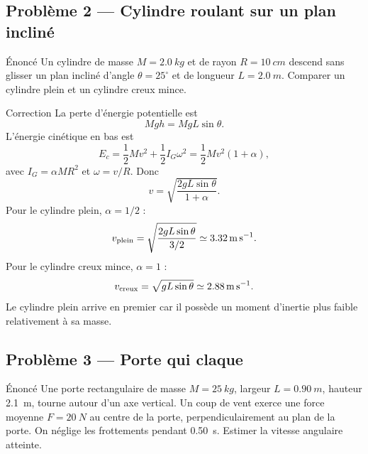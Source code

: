 \documentclass[11pt,a4paper]{article}
\begin{document}
\subsection{Problème 2 — Cylindre roulant sur un plan incliné}

\begin{exercisebox}{Énoncé}{}
Un cylindre de masse $M=\SI{2.0}{kg}$ et de rayon $R=\SI{10}{cm}$ descend sans glisser un plan incliné d'angle $\theta=25^\circ$ et de longueur $L=\SI{2.0}{m}$.
Comparer un cylindre plein et un cylindre creux mince.
\end{exercisebox}

\begin{center}
\end{center}

\begin{correctionbox}{Correction}{}
La perte d'énergie potentielle est
\[
Mgh=MgL\sin\theta.
\]
L'énergie cinétique en bas est
\[
E_c=\frac12Mv^2+\frac12I_G\omega^2
=\frac12Mv^2(1+\alpha),
\]
avec $I_G=\alpha MR^2$ et $\omega=v/R$.
Donc
\[
v=\sqrt{\frac{2gL\sin\theta}{1+\alpha}}.
\]
Pour le cylindre plein, $\alpha=1/2$ :
\[
v_{\rm plein}
=
\sqrt{\frac{2gL\sin\theta}{3/2}}
\simeq \SI{3.32}{m.s^{-1}}.
\]
Pour le cylindre creux mince, $\alpha=1$ :
\[
v_{\rm creux}
=
\sqrt{gL\sin\theta}
\simeq \SI{2.88}{m.s^{-1}}.
\]
Le cylindre plein arrive en premier car il possède un moment d'inertie plus faible relativement à sa masse.
\end{correctionbox}

\subsection{Problème 3 — Porte qui claque}

\begin{exercisebox}{Énoncé}{}
Une porte rectangulaire de masse $M=\SI{25}{kg}$, largeur $L=\SI{0.90}{m}$, hauteur \SI{2.1}{m}, tourne autour d'un axe vertical.
Un coup de vent exerce une force moyenne $F=\SI{20}{N}$ au centre de la porte, perpendiculairement au plan de la porte.
On néglige les frottements pendant \SI{0.50}{s}. Estimer la vitesse angulaire atteinte.
\end{exercisebox}
\end{document}
